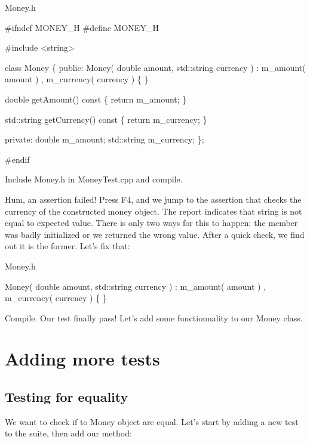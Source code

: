 {\ttfamily Money.\+h} 
\begin{DoxyCode}
\textcolor{preprocessor}{#ifndef MONEY\_H}
\textcolor{preprocessor}{#define MONEY\_H}

\textcolor{preprocessor}{#include <string>}

\textcolor{keyword}{class }Money
\{
\textcolor{keyword}{public}:
  Money( \textcolor{keywordtype}{double} amount, std::string currency )
    : m\_amount( amount )
    , m\_currency( currency )
  \{
  \}

  \textcolor{keywordtype}{double} getAmount()\textcolor{keyword}{ const}
\textcolor{keyword}{  }\{
    \textcolor{keywordflow}{return} m\_amount;
  \}

  std::string getCurrency()\textcolor{keyword}{ const}
\textcolor{keyword}{  }\{
    \textcolor{keywordflow}{return} m\_currency;
  \}

\textcolor{keyword}{private}:
  \textcolor{keywordtype}{double} m\_amount;
  std::string m\_currency;
\};

\textcolor{preprocessor}{#endif}
\end{DoxyCode}


Include {\ttfamily Money.\+h} in Money\+Test.\+cpp and compile.

Hum, an assertion failed! Press F4, and we jump to the assertion that checks the currency of the constructed money object. The report indicates that string is not equal to expected value. There is only two ways for this to happen\+: the member was badly initialized or we returned the wrong value. After a quick check, we find out it is the former. Let's fix that\+:

{\ttfamily Money.\+h} 
\begin{DoxyCode}
Money( \textcolor{keywordtype}{double} amount, std::string currency )
  : m\_amount( amount )
  , m\_currency( currency )
\{
\}
\end{DoxyCode}


Compile. Our test finally pass! Let's add some functionnality to our Money class.\hypertarget{money_example_sec_more_tests}{}\section{Adding more tests}\label{money_example_sec_more_tests}
\hypertarget{money_example_sec_equal}{}\subsection{Testing for equality}\label{money_example_sec_equal}
We want to check if to Money object are equal. Let's start by adding a new test to the suite, then add our method\+:

